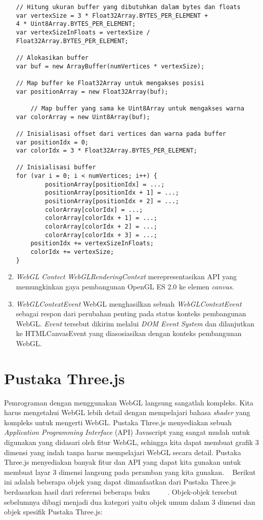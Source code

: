 \begin{enumerate}
\begin{lstlisting}[caption={Transfer data ke implementasi WebGL.}, captionpos=b]
// Hitung ukuran buffer yang dibutuhkan dalam bytes dan floats
var vertexSize = 3 * Float32Array.BYTES_PER_ELEMENT +
4 * Uint8Array.BYTES_PER_ELEMENT;
var vertexSizeInFloats = vertexSize / Float32Array.BYTES_PER_ELEMENT;

// Alokasikan buffer
var buf = new ArrayBuffer(numVertices * vertexSize);

// Map buffer ke Float32Array untuk mengakses posisi
var positionArray = new Float32Array(buf);

	// Map buffer yang sama ke Uint8Array untuk mengakses warna
var colorArray = new Uint8Array(buf);

// Inisialisasi offset dari vertices dan warna pada buffer
var positionIdx = 0;
var colorIdx = 3 * Float32Array.BYTES_PER_ELEMENT;

// Inisialisasi buffer
for (var i = 0; i < numVertices; i++) {
    	positionArray[positionIdx] = ...;
    	positionArray[positionIdx + 1] = ...;
    	positionArray[positionIdx + 2] = ...;
    	colorArray[colorIdx] = ...;
    	colorArray[colorIdx + 1] = ...;
    	colorArray[colorIdx + 2] = ...;
    	colorArray[colorIdx + 3] = ...;
   	positionIdx += vertexSizeInFloats;
   	colorIdx += vertexSize;
}
\end{lstlisting}
	
\item {\it WebGL Contect}
	{\it WebGLRenderingContext} merepresentasikan API yang memungkinkan gaya pembangunan OpenGL ES 2.0 ke elemen {\it canvas}.

\item {\it WebGLContextEvent}
	WebGL menghasilkan sebuah {\it WebGLContextEvent} sebagai respon dari perubahan penting pada status konteks pembangunan WebGL. {\it Event} tersebut dikirim melalui {\it DOM Event System} dan dilanjutkan ke HTMLCanvasEvent yang diasosiasikan dengan konteks pembangunan WebGL.

\end{enumerate}


\section{Pustaka Three.js}
\label{sec:latex}
Pemrograman dengan menggunakan WebGL langsung sangatlah kompleks. Kita harus mengetahui WebGL lebih detail dengan mempelajari bahasa {\it shader} yang kompleks untuk mengerti WebGL. Pustaka Three.js menyediakan sebuah {\it Application Programming Interface} (API) Javascript yang sangat mudah untuk digunakan yang didasari oleh fitur WebGL, sehingga kita dapat membuat grafik 3 dimensi yang indah tanpa harus mempelajari WebGL secara detail. Pustaka Three.js menyediakan banyak fitur dan API yang dapat kita gunakan untuk membuat layar 3 dimensi langsung pada peramban yang kita gunakan. ~\cite{learningThreejs}
Berikut ini adalah beberapa objek yang dapat dimanfaatkan dari Pustaka Three.js berdasarkan hasil dari referensi beberapa buku ~\cite{learningThreejs} ~\cite{introCG} ~\cite{conceptShading}. Objek-objek tersebut sebelumnya dibagi menjadi dua kategori yaitu objek umum dalam 3 dimensi dan objek spesifik Pustaka Three.js:

